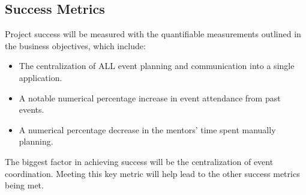 \subsection{Success Metrics}
Project success will be measured with the quantifiable measurements outlined in
the business objectives, which include:

\begin{itemize}
    \item The centralization of ALL event planning and communication into a
    single application.

    \item A notable numerical percentage increase in event attendance from past
    events.

    \item A numerical percentage decrease in the mentors' time spent manually
    planning.
\end{itemize}

The biggest factor in achieving success will be the centralization of event
coordination. Meeting this key metric will help lead to the other success
metrics being met.
